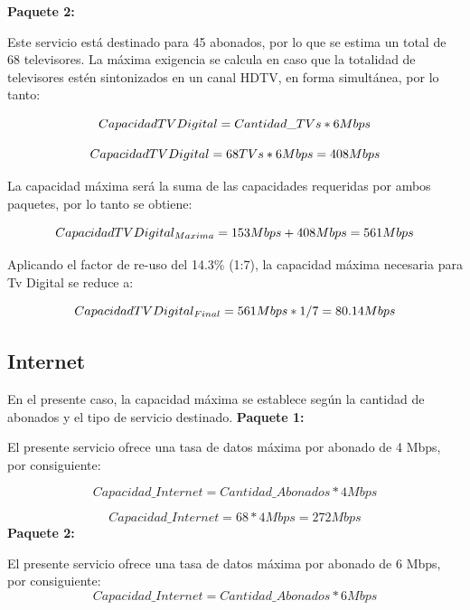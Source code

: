 \documentclass[12pt,a4paper]{book}
\begin{document}
\noindent\textbf{Paquete 2:}

Este servicio está destinado para 45 abonados, por lo que se estima un total de 68 televisores. La máxima exigencia se calcula en caso que la totalidad de televisores estén sintonizados en un canal HDTV, en forma simultánea, por lo tanto:

\begin{equation}
Capacidad\-TV\-Digital = Cantidad\_TVs * 6 Mbps
\end{equation}

\begin{equation}
Capacidad\-TV\-Digital = 68 TVs * 6 Mbps = 408 Mbps
\end{equation}

La capacidad máxima será la suma de las capacidades requeridas por ambos paquetes, por lo tanto se obtiene:

\begin{equation}
Capacidad\-TV\-Digital_{Maxima} = 153 Mbps + 408 Mbps = 561 Mbps
\end{equation}

Aplicando el factor de re-uso del 14.3\% (1:7), la capacidad máxima necesaria para Tv Digital se reduce a:

\begin{equation}
Capacidad\-TV\-Digital_{Final} = 561 Mbps * 1/7 = 80.14 Mbps
\end{equation}



\subsection{Internet}

En el presente caso, la capacidad máxima se establece según la cantidad de abonados y el tipo de servicio destinado.
\medskip
\noindent\textbf{Paquete 1:}

El presente servicio ofrece una tasa de datos máxima por abonado de 4 Mbps, por consiguiente:

\begin{equation}
Capacidad\_Internet = Cantidad\_Abonados * 4 Mbps
\end{equation}

\begin{equation}
Capacidad\_Internet= 68 * 4 Mbps = 272 Mbps
\end{equation}
\medskip
\noindent\textbf{Paquete 2:}

El presente servicio ofrece una tasa de datos máxima por abonado de 6 Mbps, por consiguiente:
\begin{equation}
Capacidad\_Internet = Cantidad\_Abonados * 6 Mbps
\end{equation}
\end{document}
